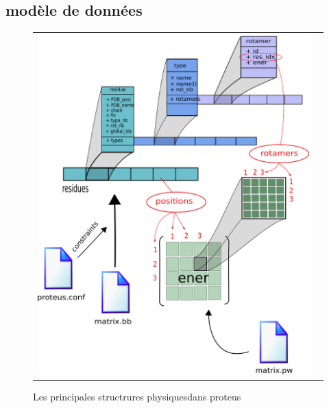    

\subsection{modèle de données} 


   \begin{figure}[t]
     \centering
     \begin{tabular}{cc}
       \includegraphics[width=12cm]{graphe/proteus/structures_physique.png} &
     \end{tabular}
     
     \caption{Les principales structrures \og physiques\fg dans proteus}
\label{graph:struct_Phy}
   \end{figure}



